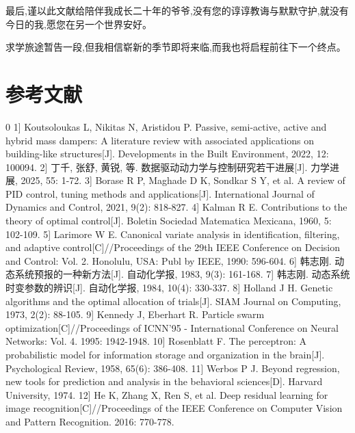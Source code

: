 \documentclass{scrbook}
\begin{document}
{最后,谨以此文献给陪伴我成长二十年的爷爷,没有您的谆谆教诲与默默守护,就没有今日的我,愿您在另一个世界安好。

求学旅途暂告一段,但我相信崭新的季节即将来临,而我也将启程\textemdash{}\textemdash{}前往下一个终点。

\chapter{\label{ref-096}参考文献}


\begin{thebibliography}{0}
\bibitem[bib-1]{}{[}1{]}	Koutsoloukas L, Nikitas N, Aristidou P. Passive, semi-active, active and hybrid mass dampers: A literature review with associated applications on building-like structures{[}J{]}. Developments in the Built Environment, 2022, 12: 100094.
\bibitem[bib-2]{}{[}2{]}	丁千, 张舒, 黄锐, 等. 数据驱动动力学与控制研究若干进展{[}J{]}. 力学进展, 2025, 55: 1-72.
\bibitem[bib-3]{}{[}3{]}	Borase R P, Maghade D K, Sondkar S Y, et al. A review of PID control, tuning methods and applications{[}J{]}. International Journal of Dynamics and Control, 2021, 9(2): 818-827.
\bibitem[bib-4]{}{[}4{]}	Kalman R E. Contributions to the theory of optimal control{[}J{]}. Boletin Sociedad Matematica Mexicana, 1960, 5: 102-109.
\bibitem[bib-5]{}{[}5{]}	Larimore W E. Canonical variate analysis in identification, filtering, and adaptive control{[}C{]}//Proceedings of the 29th IEEE Conference on Decision and Control: Vol. 2. Honolulu, USA: Publ by IEEE, 1990: 596-604.
\bibitem[bib-6]{}{[}6{]}	韩志刚. 动态系统预报的一种新方法{[}J{]}. 自动化学报, 1983, 9(3): 161-168.
\bibitem[bib-7]{}{[}7{]}	韩志刚. 动态系统时变参数的辨识{[}J{]}. 自动化学报, 1984, 10(4): 330-337.
\bibitem[bib-8]{}{[}8{]}	Holland J H. Genetic algorithms and the optimal allocation of trials{[}J{]}. SIAM Journal on Computing, 1973, 2(2): 88-105.
\bibitem[bib-9]{}{[}9{]}	Kennedy J, Eberhart R. Particle swarm optimization{[}C{]}//Proceedings of ICNN’95 - International Conference on Neural Networks: Vol. 4. 1995: 1942-1948.
\bibitem[bib-10]{}{[}10{]}	Rosenblatt F. The perceptron: A probabilistic model for information storage and organization in the brain{[}J{]}. Psychological Review, 1958, 65(6): 386-408.
\bibitem[bib-11]{}{[}11{]}	Werbos P J. Beyond regression, new tools for prediction and analysis in the behavioral sciences{[}D{]}. Harvard University, 1974.
\bibitem[bib-12]{}{[}12{]}	He K, Zhang X, Ren S, et al. Deep residual learning for image recognition{[}C{]}//Proceedings of the IEEE Conference on Computer Vision and Pattern Recognition. 2016: 770-778.

\end{thebibliography}}
\end{document}
